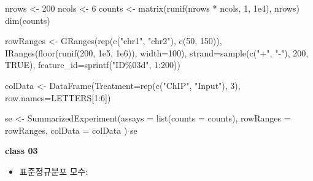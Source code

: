\documentclass[
]{book}
\newenvironment{Shaded}{\begin{snugshade}}{\end{snugshade}}
\newcommand{\AttributeTok}[1]{\textcolor[rgb]{0.77,0.63,0.00}{#1}}
\newcommand{\ConstantTok}[1]{\textcolor[rgb]{0.00,0.00,0.00}{#1}}
\newcommand{\DecValTok}[1]{\textcolor[rgb]{0.00,0.00,0.81}{#1}}
\newcommand{\FloatTok}[1]{\textcolor[rgb]{0.00,0.00,0.81}{#1}}
\newcommand{\FunctionTok}[1]{\textcolor[rgb]{0.00,0.00,0.00}{#1}}
\newcommand{\NormalTok}[1]{#1}
\newcommand{\OtherTok}[1]{\textcolor[rgb]{0.56,0.35,0.01}{#1}}
\newcommand{\SpecialCharTok}[1]{\textcolor[rgb]{0.00,0.00,0.00}{#1}}
\newcommand{\StringTok}[1]{\textcolor[rgb]{0.31,0.60,0.02}{#1}}
\providecommand{\tightlist}{%
  \setlength{\itemsep}{0pt}\setlength{\parskip}{0pt}}
\begin{document}
\begin{Shaded}
\begin{Highlighting}[]
\NormalTok{nrows }\OtherTok{\textless{}{-}} \DecValTok{200}
\NormalTok{ncols }\OtherTok{\textless{}{-}} \DecValTok{6} 
\NormalTok{counts }\OtherTok{\textless{}{-}} \FunctionTok{matrix}\NormalTok{(}\FunctionTok{runif}\NormalTok{(nrows }\SpecialCharTok{*}\NormalTok{ ncols, }\DecValTok{1}\NormalTok{, }\FloatTok{1e4}\NormalTok{), nrows)}
\FunctionTok{dim}\NormalTok{(counts)}

\NormalTok{rowRanges }\OtherTok{\textless{}{-}} \FunctionTok{GRanges}\NormalTok{(}\FunctionTok{rep}\NormalTok{(}\FunctionTok{c}\NormalTok{(}\StringTok{"chr1"}\NormalTok{, }\StringTok{"chr2"}\NormalTok{), }\FunctionTok{c}\NormalTok{(}\DecValTok{50}\NormalTok{, }\DecValTok{150}\NormalTok{)),}
                     \FunctionTok{IRanges}\NormalTok{(}\FunctionTok{floor}\NormalTok{(}\FunctionTok{runif}\NormalTok{(}\DecValTok{200}\NormalTok{, }\FloatTok{1e5}\NormalTok{, }\FloatTok{1e6}\NormalTok{)), }\AttributeTok{width=}\DecValTok{100}\NormalTok{),}
                     \AttributeTok{strand=}\FunctionTok{sample}\NormalTok{(}\FunctionTok{c}\NormalTok{(}\StringTok{"+"}\NormalTok{, }\StringTok{"{-}"}\NormalTok{), }\DecValTok{200}\NormalTok{, }\ConstantTok{TRUE}\NormalTok{),}
                     \AttributeTok{feature\_id=}\FunctionTok{sprintf}\NormalTok{(}\StringTok{"ID\%03d"}\NormalTok{, }\DecValTok{1}\SpecialCharTok{:}\DecValTok{200}\NormalTok{))}

\NormalTok{colData }\OtherTok{\textless{}{-}} \FunctionTok{DataFrame}\NormalTok{(}\AttributeTok{Treatment=}\FunctionTok{rep}\NormalTok{(}\FunctionTok{c}\NormalTok{(}\StringTok{"ChIP"}\NormalTok{, }\StringTok{"Input"}\NormalTok{), }\DecValTok{3}\NormalTok{),}
                     \AttributeTok{row.names=}\NormalTok{LETTERS[}\DecValTok{1}\SpecialCharTok{:}\DecValTok{6}\NormalTok{])}

\NormalTok{se }\OtherTok{\textless{}{-}} \FunctionTok{SummarizedExperiment}\NormalTok{(}\AttributeTok{assays =} \FunctionTok{list}\NormalTok{(}\AttributeTok{counts =}\NormalTok{ counts),}
                           \AttributeTok{rowRanges =}\NormalTok{ rowRanges,}
                           \AttributeTok{colData =}\NormalTok{ colData}
\NormalTok{                           )}
\NormalTok{se}
\end{Highlighting}
\end{Shaded}

\textbf{class 03}

\begin{itemize}
\tightlist
\item
  표준정규분포 모수:
\end{itemize}
\end{document}
